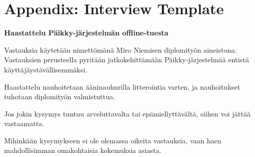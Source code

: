 

\chapter{Appendix: Interview Template}

\textbf{Haastattelu Päikky-järjestelmän offline-tuesta}

Vastauksia käytetään nimettömänä Miro Niemisen diplomityön aineistona. Vastauksien perusteella pyritään jatkokehittämään Päikky-järjestelmää entistä käyttäjäystävällisemmäksi. 

Haastattelu nauhoitetaan ääninauhurilla litterointia varten, ja nauhoitukset tuhotaan diplomityön valmistuttua. 

Jos jokin kysymys tuntuu arveluttavalta tai epämiellyttävältä, siihen voi jättää vastaamatta. 

Mihinkään kysymykseen ei ole olemassa oikeita vastauksia, vaan haen mahdollisimman omakohtaisia kokemuksia asiasta.


